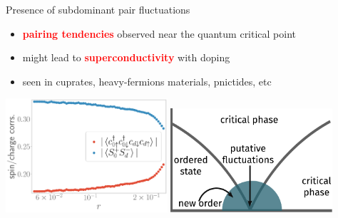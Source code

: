 \documentclass[10pt,aspectratio=169]{beamer}
\newcommand{\focus}[1]{\textcolor{red}{\bf{#1}}}
\begin{document}
\begin{frame}{Presence of subdominant pair fluctuations}
	
\begin{itemize}
	\item \focus{pairing tendencies} observed near the quantum critical point\\[10pt]
	\item might lead to \focus{superconductivity} with doping\\[10pt]
	\item seen in cuprates, heavy-fermions materials, pnictides, etc\\[10pt]
\end{itemize}
\includegraphics[width=0.45\textwidth]{odlro_d0.pdf}
\hspace*{\fill}
\includegraphics[width=0.45\textwidth]{gen-phase-diagram.pdf}
\end{frame}
\end{document}
